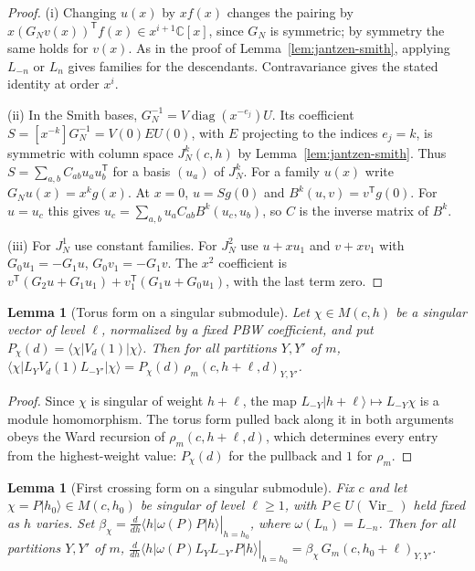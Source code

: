 \documentclass[twoside,10pt]{article}
\numberwithin{equation}{section}
\theoremstyle{slbody}
\newtheorem{lemma}[theorem]{Lemma}
\theoremstyle{definition}
\theoremstyle{remark}
\newcommand{\Vir}{\operatorname{Vir}}
\begin{document}
\begin{proof}
(i) Changing \(u(x)\) by \(xf(x)\) changes the pairing by
\(x(G_Nv(x))^{\mathsf T}f(x)\in x^{i+1}\mathbb C[x]\), since \(G_N\) is symmetric;
by symmetry the same holds for \(v(x)\). As in the proof of
Lemma~\ref{lem:jantzen-smith}, applying \(L_{-n}\) or \(L_n\) gives families
for the descendants. Contravariance gives the stated identity at order \(x^i\).

(ii) In the Smith bases, \(G_N^{-1}=V\operatorname{diag}(x^{-e_j})U\).
Its coefficient \(S=[x^{-k}]G_N^{-1}=V(0)EU(0)\), with \(E\) projecting to
the indices \(e_j=k\), is symmetric with column space \(J_N^k(c,h)\) by Lemma~\ref{lem:jantzen-smith}.
Thus \(S=\sum_{a,b}C_{ab}u_au_b^{\mathsf T}\) for a basis \((u_a)\) of
\(J_N^k\). For a family \(u(x)\) write \(G_Nu(x)=x^kg(x)\).
At \(x=0\), \(u=Sg(0)\) and \(B^k(u,v)=v^{\mathsf T}g(0)\).
For \(u=u_c\) this gives \(u_c=\sum_{a,b}u_aC_{ab}B^k(u_c,u_b)\), so
\(C\) is the inverse matrix of \(B^k\).

(iii) For \(J^1_N\) use constant families. For \(J^2_N\) use
\(u+xu_1\) and \(v+xv_1\) with \(G_0u_1=-G_1u\), \(G_0v_1=-G_1v\).
The \(x^2\) coefficient is
\(v^{\mathsf T}(G_2u+G_1u_1)+v_1^{\mathsf T}(G_1u+G_0u_1)\), with the
last term zero.
\end{proof}

\begin{lemma}[Torus form on a singular submodule]
\label{lem:singular-factorization}
Let \(\chi\in M(c,h)\) be a singular vector of level \(\ell\), normalized
by a fixed PBW coefficient, and put \(P_\chi(d)=\langle\chi|V_d(1)|\chi\rangle\).
Then for all partitions \(Y,Y'\) of \(m\),
\(\langle\chi|L_YV_d(1)L_{-Y'}|\chi\rangle=P_\chi(d)\,\rho_m(c,h+\ell,d)_{Y,Y'}\).
\end{lemma}

\begin{proof}
Since \(\chi\) is singular of weight \(h+\ell\), the map
\(L_{-Y}|h+\ell\rangle\mapsto L_{-Y}\chi\) is a module homomorphism.
The torus form pulled back along it in both arguments obeys the Ward
recursion of \(\rho_m(c,h+\ell,d)\), which determines every entry from the
highest-weight value: \(P_\chi(d)\) for the pullback and \(1\) for \(\rho_m\).
\end{proof}

\begin{lemma}[First crossing form on a singular submodule]
\label{lem:singular-crossing}
Fix \(c\) and let \(\chi=P|h_0\rangle\in M(c,h_0)\) be singular of level
\(\ell\geq1\), with \(P\in U(\Vir_-)\) held fixed as \(h\) varies.  Set
\(\beta_\chi=\left.\frac{d}{dh}\langle h|\omega(P)P|h\rangle\right|_{h=h_0}\),
where \(\omega(L_n)=L_{-n}\).  Then for all partitions \(Y,Y'\) of \(m\),
\(\left.\frac{d}{dh}\langle h|\omega(P)L_YL_{-Y'}P|h\rangle\right|_{h=h_0}
=\beta_\chi\,G_m(c,h_0+\ell)_{Y,Y'}\).
\end{lemma}
\end{document}
